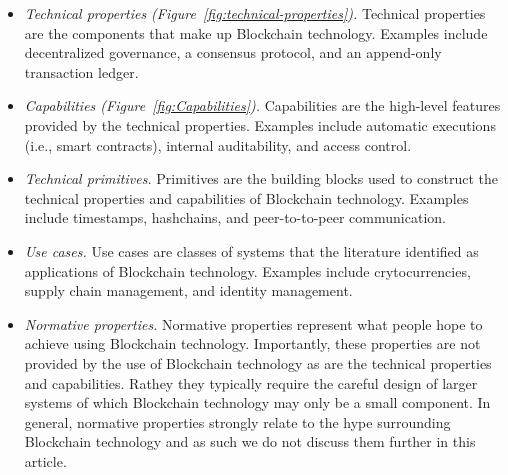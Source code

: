 \begin{itemize}
	\item \emph{Technical properties (Figure~\ref{fig:technical-properties}).}
	Technical properties are the components that make up Blockchain technology. 
	Examples include decentralized governance, a consensus protocol, and an 
	append-only transaction ledger.
	
	\item \emph{Capabilities (Figure~\ref{fig:Capabilities}).}
	Capabilities are the high-level features provided by the technical 
	properties. Examples include automatic executions (i.e., smart contracts), 
	internal auditability, and access control.
	
	\item \emph{Technical primitives.}
	Primitives are the building blocks used to construct the technical properties and capabilities of Blockchain technology. Examples include timestamps, hashchains, and peer-to-to-peer communication.
	
	\item \emph{Use cases.}
	Use cases are classes of systems that the literature identified as 
	applications of Blockchain technology. Examples include crytocurrencies, 
	supply chain management, and identity management.
	
	\item \emph{Normative properties.} 
	Normative properties represent what people hope to achieve using Blockchain technology. 
	Importantly, these properties are not provided by the use of Blockchain 
	technology as are the technical properties and capabilities. Rathey they 
	typically require the careful design of larger systems of which Blockchain 
	technology may only be a small component.
	In general, normative properties strongly relate to the hype surrounding Blockchain technology
	and as such we do not discuss them further in this article.
\end{itemize}

